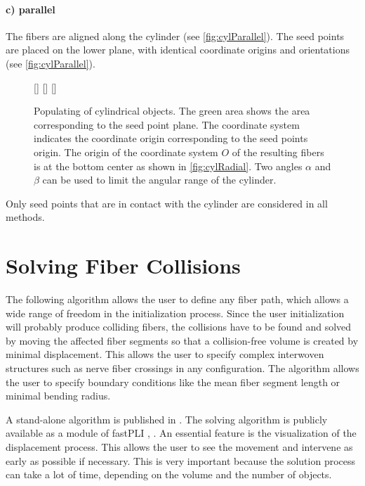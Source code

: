 \paragraph{c) parallel}
The fibers are aligned along the cylinder (see \cref{fig:cylParallel}).
The seed points are placed on the lower plane, with identical coordinate origins and orientations (see \cref{fig:cylParallel}).
%
\begin{figure}[!t]
    \centering
    \setlength{\tikzwidth}{0.3\textwidth}
    \captionsetup[subfigure]{skip=-10pt}
    [\tikzwidth]{%
    }\hfill
    [\tikzwidth]{%
    }\hfill
    [\tikzwidth]{%
    }
	\caption[]{Populating of cylindrical objects.
    The green area shows the area corresponding to the seed point plane.
    The coordinate system indicates the coordinate origin corresponding to the seed points origin.
    The origin of the coordinate system $O$ of the resulting fibers is at the bottom center as shown in \cref{fig:cylRadial}.
    Two angles $\alpha$ and $\beta$ can be used to limit the angular range of the cylinder.}
\end{figure}
%
\par
Only seed points that are in contact with the cylinder are considered in all methods.
%
%
\section{Solving Fiber Collisions}
\label{sec:Solver}
%
The following algorithm allows the user to define any fiber path, which allows a wide range of freedom in the initialization process.
Since the user initialization will probably produce colliding fibers, the collisions have to be found and solved by moving the affected fiber segments so that a collision-free volume is created by minimal displacement.
This allows the user to specify complex interwoven structures such as nerve fiber crossings in any configuration.
The algorithm allows the user to specify boundary conditions like the mean fiber segment length or minimal bending radius.
\par
%
A stand-alone algorithm is published in \cite{Matuschke2019}.
The solving algorithm is publicly available as a module of \ac{fastPLI} \cite{Matuschke2021}, .
An essential feature is the visualization of the displacement process.
This allows the user to see the movement and intervene as early as possible if necessary.
This is very important because the solution process can take a lot of time, depending on the volume and the number of objects.
%
%
%

